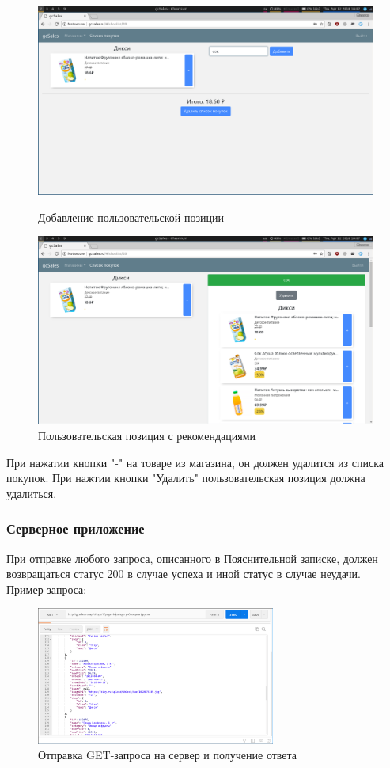 \begin{figure}[H]
    \centering
    \includegraphics[width=\textwidth]{./screenshots/add_custom.png}
    \caption{Добавление пользовательской позиции}
    \endminipage
    \includegraphics[width=\textwidth]{./screenshots/custom_created.png}
    \caption{Пользовательская позиция с рекомендациями}
    \endminipage
\end{figure}

При нажатии кнопки "-" на товаре из магазина, он должен удалится из списка
покупок. При нажтии кнопки "Удалить" пользовательская позиция должна удалиться.

\subsubsection{Серверное приложение}
При отправке любого запроса, описанного в Пояснительной записке, должен
возвращаться статус 200 в случае успеха и иной статус в случае неудачи.\\
Пример запроса:
\begin{figure}[H]
    \centering
    \includegraphics[width=0.7\textwidth]{./screenshots/postman.png}
    \caption{Отправка GET-запроса на сервер и получение ответа}
\end{figure}

